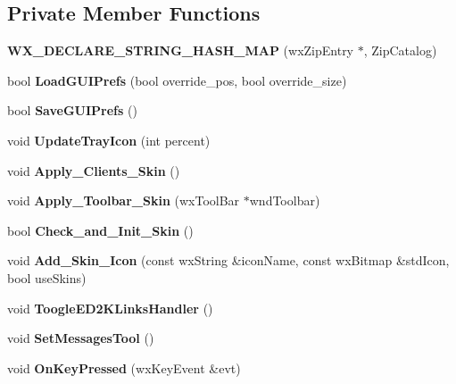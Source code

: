 \subsection*{Private Member Functions}
\begin{DoxyCompactItemize}
\item 
{\bfseries WX\_\-DECLARE\_\-STRING\_\-HASH\_\-MAP} (wxZipEntry $\ast$, ZipCatalog)\label{classCamuleDlg_a1cc3bf546cb1171dcf915c6c967104c5}

\item 
bool {\bfseries LoadGUIPrefs} (bool override\_\-pos, bool override\_\-size)\label{classCamuleDlg_aec191b6c0bb27ef2b795c295a55dbc58}

\item 
bool {\bfseries SaveGUIPrefs} ()\label{classCamuleDlg_abbf45ffeddb214d9e1abd15002cee9e4}

\item 
void {\bfseries UpdateTrayIcon} (int percent)\label{classCamuleDlg_a98230d582cba2bf4d15f262dac89ed50}

\item 
void {\bfseries Apply\_\-Clients\_\-Skin} ()\label{classCamuleDlg_a637bccd3c5b540fc4cfc0df0c5944ada}

\item 
void {\bfseries Apply\_\-Toolbar\_\-Skin} (wxToolBar $\ast$wndToolbar)\label{classCamuleDlg_ad5ae053a5555c345b51f61692bfac8a5}

\item 
bool {\bfseries Check\_\-and\_\-Init\_\-Skin} ()\label{classCamuleDlg_a06dd518b17efeb9dca021b387c8e6f2a}

\item 
void {\bfseries Add\_\-Skin\_\-Icon} (const wxString \&iconName, const wxBitmap \&stdIcon, bool useSkins)\label{classCamuleDlg_a7a29febf89918ef72db379e24c738b20}

\item 
void {\bfseries ToogleED2KLinksHandler} ()\label{classCamuleDlg_aee60c7f6ee6515b465e81254687c253c}

\item 
void {\bfseries SetMessagesTool} ()\label{classCamuleDlg_a6c26d4a4d3c7a9714b9f9464c79c009e}

\item 
void {\bfseries OnKeyPressed} (wxKeyEvent \&evt)\label{classCamuleDlg_aa38c4bec9caa9fe0da4dc4e79f37395a}

\end{DoxyCompactItemize}
